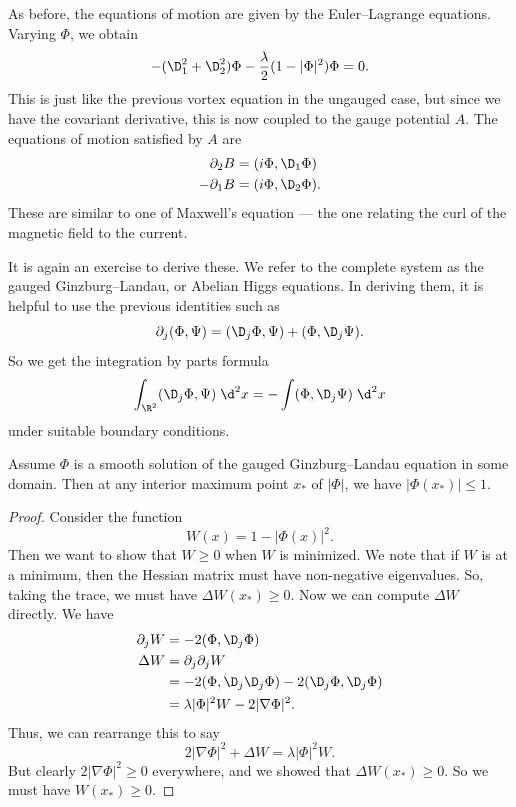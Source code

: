 \documentclass[a4paper]{article}
\begin{document}
As before, the equations of motion are given by the Euler--Lagrange equations. Varying $\Phi$, we obtain
\[
  - (\D_1^2 + \D_2^2) \Phi - \frac{\lambda}{2} (1 - |\Phi|^2)\Phi = 0.
\]
This is just like the previous vortex equation in the ungauged case, but since we have the covariant derivative, this is now coupled to the gauge potential $A$. The equations of motion satisfied by $A$ are
\begin{align*}
  \partial_2 B &= (i \Phi, \D_1 \Phi)\\
  -\partial_1 B &= (i \Phi, \D_2 \Phi).
\end{align*}
These are similar to one of Maxwell's equation --- the one relating the curl of the magnetic field to the current.

It is again an exercise to derive these. We refer to the complete system as the gauged Ginzburg--Landau, or Abelian Higgs equations. In deriving them, it is helpful to use the previous identities such as
\[
  \partial_j (\Phi, \Psi) = (\D_j \Phi, \Psi) + (\Phi, \D_j \Psi).
\]
So we get the integration by parts formula
\[
  \int_{\R^2} (\D_j \Phi, \Psi)\;\d^2 x = - \int (\Phi, \D_j \Psi)\;\d^2 x
\]
under suitable boundary conditions.

\begin{lemma}
  Assume $\Phi$ is a smooth solution of the gauged Ginzburg--Landau equation in some domain. Then at any interior maximum point $x_*$ of $|\Phi|$, we have $|\Phi(x_*)| \leq 1$.
\end{lemma}

\begin{proof}
  Consider the function
  \[
    W(x) = 1 - |\Phi(x)|^2.
  \]
  Then we want to show that $W \geq 0$ when $W$ is minimized. We note that if $W$ is at a minimum, then the Hessian matrix must have non-negative eigenvalues. So, taking the trace, we must have $\Delta W(x_*) \geq 0$. Now we can compute $\Delta W$ directly. We have
  \begin{align*}
    \partial_j W &= -2 (\Phi, \D_j \Phi)\\
    \Delta W &= \partial_j \partial_j W \\
    &= - 2(\Phi, \D_j \D_j \Phi) - 2(\D_j \Phi, \D_j \Phi)\\
    &= \lambda |\Phi|^2 W - 2 |\nabla \Phi|^2.
  \end{align*}
  Thus, we can rearrange this to say
  \[
    2 |\nabla \Phi|^2 + \Delta W = \lambda |\Phi|^2 W.
  \]
  But clearly $2 |\nabla \Phi|^2 \geq 0$ everywhere, and we showed that $\Delta W(x_*) \geq 0$. So we must have $W(x_*) \geq 0$.
\end{proof}
\end{document}
